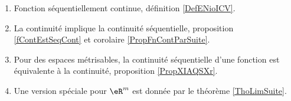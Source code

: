 
\begin{enumerate}
	\item
	      Fonction séquentiellement continue, définition \ref{DefENioICV}.
	\item
	      La continuité implique la continuité séquentielle, proposition \ref{fContEstSeqCont} et corolaire \ref{PropFnContParSuite}.
	\item
	      Pour des espaces métrisables, la continuité séquentielle d'une fonction est équivalente à la continuité, proposition \ref{PropXIAQSXr}.
	\item
	      Une version spéciale pour \( \eR^m\) est donnée par le théorème \ref{ThoLimSuite}.
\end{enumerate}


